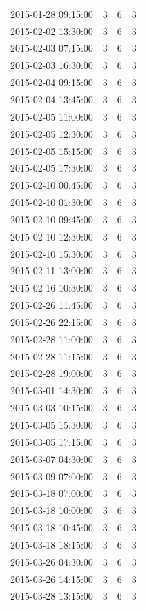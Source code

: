 \begin{tabular}{lrrr}
2015-01-28 09:15:00 & 3 & 6 & 3 \\
2015-02-02 13:30:00 & 3 & 6 & 3 \\
2015-02-03 07:15:00 & 3 & 6 & 3 \\
2015-02-03 16:30:00 & 3 & 6 & 3 \\
2015-02-04 09:15:00 & 3 & 6 & 3 \\
2015-02-04 13:45:00 & 3 & 6 & 3 \\
2015-02-05 11:00:00 & 3 & 6 & 3 \\
2015-02-05 12:30:00 & 3 & 6 & 3 \\
2015-02-05 15:15:00 & 3 & 6 & 3 \\
2015-02-05 17:30:00 & 3 & 6 & 3 \\
2015-02-10 00:45:00 & 3 & 6 & 3 \\
2015-02-10 01:30:00 & 3 & 6 & 3 \\
2015-02-10 09:45:00 & 3 & 6 & 3 \\
2015-02-10 12:30:00 & 3 & 6 & 3 \\
2015-02-10 15:30:00 & 3 & 6 & 3 \\
2015-02-11 13:00:00 & 3 & 6 & 3 \\
2015-02-16 10:30:00 & 3 & 6 & 3 \\
2015-02-26 11:45:00 & 3 & 6 & 3 \\
2015-02-26 22:15:00 & 3 & 6 & 3 \\
2015-02-28 11:00:00 & 3 & 6 & 3 \\
2015-02-28 11:15:00 & 3 & 6 & 3 \\
2015-02-28 19:00:00 & 3 & 6 & 3 \\
2015-03-01 14:30:00 & 3 & 6 & 3 \\
2015-03-03 10:15:00 & 3 & 6 & 3 \\
2015-03-05 15:30:00 & 3 & 6 & 3 \\
2015-03-05 17:15:00 & 3 & 6 & 3 \\
2015-03-07 04:30:00 & 3 & 6 & 3 \\
2015-03-09 07:00:00 & 3 & 6 & 3 \\
2015-03-18 07:00:00 & 3 & 6 & 3 \\
2015-03-18 10:00:00 & 3 & 6 & 3 \\
2015-03-18 10:45:00 & 3 & 6 & 3 \\
2015-03-18 18:15:00 & 3 & 6 & 3 \\
2015-03-26 04:30:00 & 3 & 6 & 3 \\
2015-03-26 14:15:00 & 3 & 6 & 3 \\
2015-03-28 13:15:00 & 3 & 6 & 3 \\

\end{tabular}
